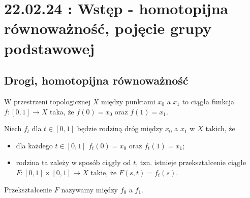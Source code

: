 \section{22.02.24 : Wstęp - homotopijna równoważność, pojęcie grupy podstawowej}

\subsection{Drogi, homotopijna równoważność}

W przestrzeni topologicznej $X$  między punktami $x_0$ a $x_1$ to ciągła funkcja $f:[0,1]\to X$ taka, że $f(0)=x_0$ oraz $f(1)=x_1$.

\begin{definition}[homotopia]
  Niech $f_t$ dla $t\in[0,1]$ będzie rodziną dróg między $x_0$ a $x_1$ w $X$ takich, że
  \begin{itemize}
    \item dla każdego $t\in[0,1]$ $f_t(0)=x_0$ oraz $f_t(1)=x_1$;
    \item rodzina ta zależy w sposób ciągły od $t$, tzn. istnieje przekształcenie ciągłe $F:[0,1]\times[0,1]\to X$ takie, że $F(s, t)=f_t(s)$.
  \end{itemize}
  Przekształcenie $F$ nazywamy  między $f_0$ a $f_1$.
\end{definition}

